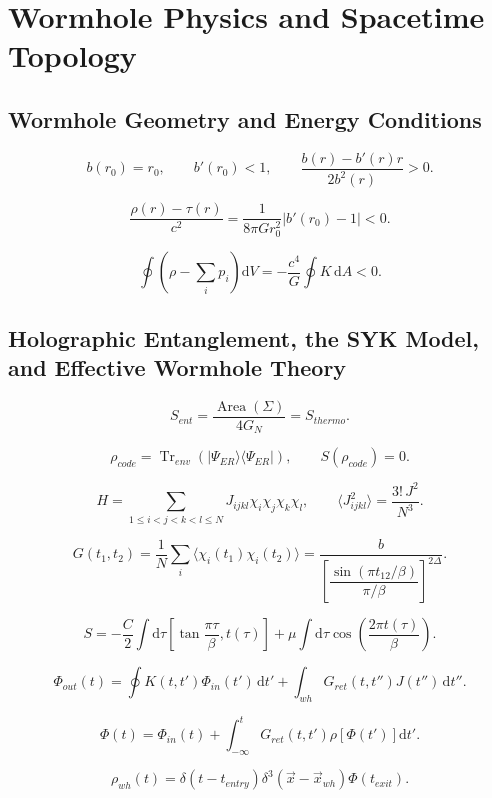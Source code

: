 \documentclass[11pt,a4paper]{article}
\newcommand{\Tr}{\operatorname{Tr}}
\newcommand{\Area}{\operatorname{Area}}
\newcommand{\dd}{\mathrm{d}}
\begin{document}
\section{Wormhole Physics and Spacetime Topology}

\subsection{Wormhole Geometry and Energy Conditions}

\[
b(r_0)=r_0,\qquad b'(r_0)<1,\qquad
\frac{b(r)-b'(r)r}{2b^2(r)}>0.
\]

\[
\frac{\rho(r)-\tau(r)}{c^2}
=\frac{1}{8\pi Gr_0^2}|b'(r_0)-1|<0.
\]

\[
\oint\left(\rho-\sum_i p_i\right)\dd V
=-\frac{c^4}{G}\oint K\,\dd A<0.
\]

\subsection{Holographic Entanglement, the SYK Model, and Effective Wormhole Theory}

\[
S_{ent}=\frac{\Area(\Sigma)}{4G_N}=S_{thermo}.
\]

\[
\rho_{code}=\Tr_{env}\left(|\Psi_{ER}\rangle\langle\Psi_{ER}|\right),
\qquad S(\rho_{code})=0.
\]

\[
H=\sum_{1\le i<j<k<l\le N}J_{ijkl}\chi_i\chi_j\chi_k\chi_l,
\qquad
\langle J_{ijkl}^2\rangle=\frac{3!\,J^2}{N^3}.
\]

\[
G(t_1,t_2)=\frac1N\sum_i\langle\chi_i(t_1)\chi_i(t_2)\rangle
=\frac{b}{\left[\dfrac{\sin(\pi t_{12}/\beta)}{\pi/\beta}\right]^{2\Delta}}.
\]

\[
S=-\frac{C}{2}\int\dd\tau
\left[\tan\frac{\pi\tau}{\beta},t(\tau)\right]
+\mu\int\dd\tau\cos\left(\frac{2\pi t(\tau)}{\beta}\right).
\]

\[
\Phi_{out}(t)=\oint K(t,t')\Phi_{in}(t')\,\dd t'
+\int_{wh}G_{ret}(t,t'')J(t'')\,\dd t''.
\]

\[
\Phi(t)=\Phi_{in}(t)
+\int_{-\infty}^{t}G_{ret}(t,t')\rho\left[\Phi(t')\right]\dd t'.
\]

\[
\rho_{wh}(t)=\delta(t-t_{entry})
\delta^3\left(\vec x-\vec x_{wh}\right)\Phi(t_{exit}).
\]
\end{document}
